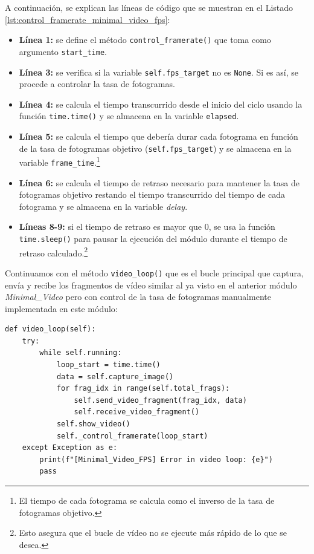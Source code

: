 A continuación, se explican las líneas de código que se muestran en el Listado \ref{lst:control_framerate_minimal_video_fps}:
\begin{itemize}
    \item \textbf{Línea 1:} se define el método \texttt{control\_framerate()} que toma como argumento \texttt{start\_time}.
    \item \textbf{Línea 3:} se verifica si la variable \texttt{self.fps\_target} no es \texttt{None}. Si es así, se procede a controlar la tasa de fotogramas.
    \item \textbf{Línea 4:} se calcula el tiempo transcurrido desde el inicio del ciclo usando la función \texttt{time.time()} y se almacena en la variable \texttt{elapsed}.
    \item \textbf{Línea 5:} se calcula el tiempo que debería durar cada fotograma en función de la tasa de fotogramas objetivo (\texttt{self.fps\_target}) y se almacena en la variable \texttt{frame\_time}.\footnote{El tiempo de cada fotograma se calcula como el inverso de la tasa de fotogramas objetivo.}
    \item \textbf{Línea 6:} se calcula el tiempo de retraso necesario para mantener la tasa de fotogramas objetivo restando el tiempo transcurrido del tiempo de cada fotograma y se almacena en la variable \textit{delay}.
    \item \textbf{Líneas 8-9:} si el tiempo de retraso es mayor que 0, se usa la función \texttt{time.sleep()} para pausar la ejecución del módulo durante el tiempo de retraso calculado.\footnote{Esto asegura que el bucle de vídeo no se ejecute más rápido de lo que se desea.}
\end{itemize}
\vspace{\baselineskip}

Continuamos con el método \texttt{video\_loop()} que es el bucle principal que captura, envía y recibe los fragmentos de vídeo similar al ya visto en el anterior módulo \textit{Minimal\_Video} pero con control de la tasa de fotogramas manualmente implementada en este módulo:
\begin{lstlisting}[style=pythonstyle, caption={Método \texttt{video\_loop()} de \textit{Minimal\_Video\_FPS}.}, label={lst:video_loop_minimal_video_fps}]
def video_loop(self):
    try:
        while self.running:
            loop_start = time.time()
            data = self.capture_image()
            for frag_idx in range(self.total_frags):
                self.send_video_fragment(frag_idx, data)
                self.receive_video_fragment()
            self.show_video()
            self._control_framerate(loop_start)
    except Exception as e:
        print(f"[Minimal_Video_FPS] Error in video loop: {e}")
        pass
\end{lstlisting}
\vspace{\baselineskip}

